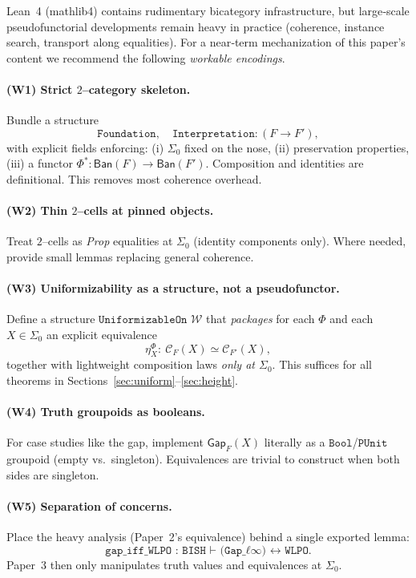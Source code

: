 \documentclass[11pt]{article}
\theoremstyle{definition}
\theoremstyle{remark}
\newcommand{\Ban}{\mathsf{Ban}}
\newcommand{\SigmaZero}{\Sigma_{0}}
\begin{document}
Lean~4 (mathlib4) contains rudimentary bicategory infrastructure, but large‑scale pseudofunctorial developments remain heavy in practice (coherence, instance search, transport along equalities). For a near‑term mechanization of this paper’s content we recommend the following \emph{workable encodings}.

\paragraph{(W1) Strict $2$--category skeleton.}
Bundle a structure
\[
  \texttt{Foundation},\quad \texttt{Interpretation}:(F\to F'),
\]
with explicit fields enforcing: (i) \(\SigmaZero\) fixed on the nose, (ii) preservation properties, (iii) a functor \(\Phi^*:\Ban(F)\to\Ban(F')\). Composition and identities are definitional. This removes most coherence overhead.

\paragraph{(W2) Thin $2$--cells at pinned objects.}
Treat $2$--cells as \emph{Prop} equalities at \(\SigmaZero\) (identity components only). Where needed, provide small lemmas replacing general coherence.

\paragraph{(W3) Uniformizability as a structure, not a pseudofunctor.}
Define a structure \(\texttt{UniformizableOn } \mathcal W\) that \emph{packages} for each \(\Phi\) and each \(X\in\SigmaZero\) an explicit equivalence
\[
  \eta^\Phi_X:\ \mathcal C_F(X)\simeq\mathcal C_{F'}(X),
\]
together with lightweight composition laws \emph{only at \(\SigmaZero\)}. This suffices for all theorems in Sections~\ref{sec:uniform}--\ref{sec:height}.

\paragraph{(W4) Truth groupoids as booleans.}
For case studies like the gap, implement \(\mathsf{Gap}_F(X)\) literally as a \(\texttt{Bool}\)/\(\texttt{PUnit}\) groupoid (empty vs.\ singleton). Equivalences are trivial to construct when both sides are singleton.

\paragraph{(W5) Separation of concerns.}
Place the heavy analysis (Paper~2’s equivalence) behind a single exported lemma:
\[
  \texttt{gap\_iff\_WLPO : BISH ⊢ (Gap\_ℓ∞) ↔ WLPO.}
\]
Paper~3 then only manipulates truth values and equivalences at \(\SigmaZero\).
\end{document}
